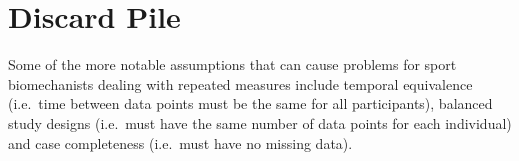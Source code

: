 \documentclass[
]{article}
\begin{document}
\hypertarget{discard-pile}{%
\section{Discard Pile}\label{discard-pile}}

Some of the more notable assumptions that can cause problems for sport biomechanists dealing with repeated measures include temporal equivalence (i.e.~time between data points must be the same for all participants), balanced study designs (i.e.~must have the same number of data points for each individual) and case completeness (i.e.~must have no missing data).

\newpage
\singlespacing
{}


\end{document}
